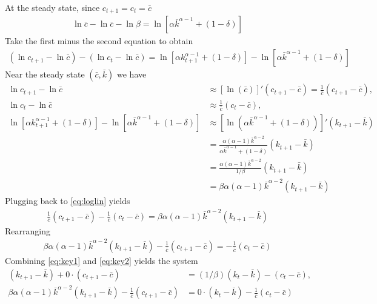 \documentclass[11pt,a4paper]{book}
\theoremstyle{definition}\newtheorem{definition}{Definition}
\theoremstyle{definition}\newtheorem{fact}{Fact}
\theoremstyle{definition}\newtheorem{remark}{Remark}
\theoremstyle{definition}\newtheorem{ex}{Ex.}
\theoremstyle{definition}\newtheorem{project}{Project}
\theoremstyle{definition}\newtheorem{problem}{Problem}
\theoremstyle{definition}\newtheorem{example}{Example}
\numberwithin{theorem}{section}
\numberwithin{corollary}{chapter}
\numberwithin{assumption}{chapter}
\numberwithin{definition}{chapter}
\numberwithin{prop}{chapter}
\numberwithin{notation}{chapter}
\numberwithin{problem}{chapter}
\numberwithin{example}{chapter}
\numberwithin{fact}{chapter}
\numberwithin{ex}{chapter}
\begin{document}
	At the steady state, since $c_{t+1} = c_t = \bar{c}$
	\begin{align*}
		\ln \bar{c} - \ln \bar{c} - \ln\beta = \ln [\alpha \bar{k}^{\alpha-1} + (1-\delta) ]
	\end{align*}
	Take the first minus the second equation to obtain
	\begin{align}
		(\ln c_{t+1} - \ln \bar{c})  - (\ln c_t - \ln \bar{c}) = \ln [\alpha k_{t+1}^{\alpha-1} + (1-\delta) ] - \ln [\alpha \bar{k}^{\alpha-1} + (1-\delta) ] \label{eq:loglin}
	\end{align}
	Near the steady state $(\bar{c},\bar{k})$ we have
	\begin{align*}
		\ln c_{t+1} - \ln \bar{c} &\approx [\ln(\bar{c})]' (c_{t+1} - \bar{c}) = \frac{1}{\bar{c}} (c_{t+1} - \bar{c}), \\
		\ln c_{t} - \ln \bar{c} &\approx  \frac{1}{\bar{c}} (c_{t} - \bar{c}),  \\
		\ln [\alpha k_{t+1}^{\alpha-1} + (1-\delta) ] - \ln [\alpha \bar{k}^{\alpha-1} + (1-\delta) ] &\approx [\ln (\alpha \bar{k}^{\alpha-1} + (1-\delta) )]' (k_{t+1} - \bar{k}) \\
		&= \frac{\alpha(\alpha-1)\bar{k}^{\alpha-2}}{\alpha \bar{k}^{\alpha-1} + (1-\delta) } (k_{t+1} - \bar{k})\\
		&= \frac{\alpha(\alpha-1)\bar{k}^{\alpha-2}}{1/\beta} (k_{t+1} - \bar{k}) \\
		&= \beta \alpha(\alpha-1)\bar{k}^{\alpha-2} (k_{t+1} - \bar{k})
	\end{align*}
	Plugging back to \eqref{eq:loglin} yields
	\begin{align}
		\frac{1}{\bar{c}} (c_{t+1} - \bar{c}) - \frac{1}{\bar{c}} (c_{t} - \bar{c}) = \beta \alpha(\alpha-1)\bar{k}^{\alpha-2} (k_{t+1} - \bar{k})
	\end{align}
	Rearranging
	\begin{align}
		\beta \alpha(\alpha-1)\bar{k}^{\alpha-2} (k_{t+1} - \bar{k}) - \frac{1}{\bar{c}} (c_{t+1} - \bar{c}) = - \frac{1}{\bar{c}} (c_{t} - \bar{c}) \label{eq:key2}
	\end{align}
	Combining \eqref{eq:key1} and \eqref{eq:key2} yields the system
	\begin{align*}
		( k_{t+1} - \bar{k}) + 0 \cdot (c_{t+1}-\bar{c}) &= (1/\beta)(k_t - \bar{k}) - (c_t - \bar{c}), \\
		\beta \alpha(\alpha-1)\bar{k}^{\alpha-2} (k_{t+1} - \bar{k}) - \frac{1}{\bar{c}} (c_{t+1} - \bar{c}) &= 0\cdot(k_t - \bar{k})  - \frac{1}{\bar{c}} (c_{t} - \bar{c})
	\end{align*}
\end{document}
